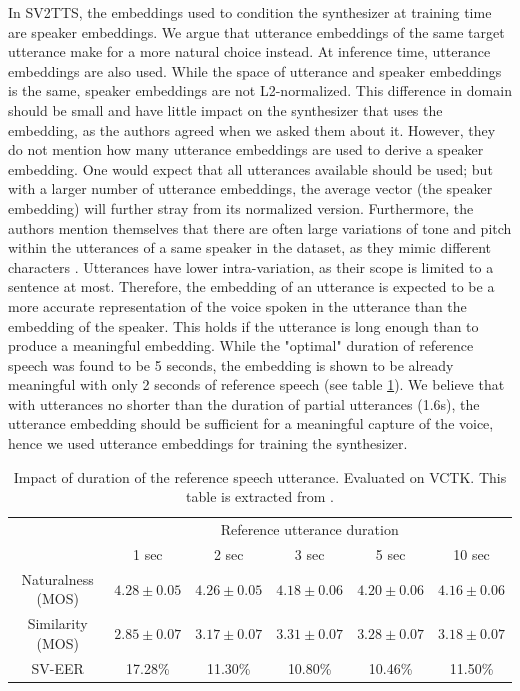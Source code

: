 \documentclass[a4paper, oneside, 12pt, english]{article}
\begin{document}
In SV2TTS, the embeddings used to condition the synthesizer at training time are speaker embeddings. We argue that utterance embeddings of the same target utterance make for a more natural choice instead. At inference time, utterance embeddings are also used. While the space of utterance and speaker embeddings is the same, speaker embeddings are not L2-normalized. This difference in domain should be small and have little impact on the synthesizer that uses the embedding, as the authors agreed when we asked them about it. However, they do not mention how many utterance embeddings are used to derive a speaker embedding. One would expect that all utterances available should be used; but with a larger number of utterance embeddings, the average vector (the speaker embedding) will further stray from its normalized version. Furthermore, the authors mention themselves that there are often large variations of tone and pitch within the utterances of a same speaker in the dataset, as they mimic different characters \citep[Appendix B]{SV2TTS}. Utterances have lower intra-variation, as their scope is limited to a sentence at most. Therefore, the embedding of an utterance is expected to be a more accurate representation of the voice spoken in the utterance than the embedding of the speaker. This holds if the utterance is long enough than to produce a meaningful embedding. While the "optimal" duration of reference speech was found to be 5 seconds, the embedding is shown to be already meaningful with only 2 seconds of reference speech (see table \ref{reference_speech_duration}). We believe that with utterances no shorter than the duration of partial utterances (1.6s), the utterance embedding should be sufficient for a meaningful capture of the voice, hence we used utterance embeddings for training the synthesizer.

\begin{table}[h]
	\begin{center}
		\begin{small}
			\begin{tabular}{cccccc}
				\toprule
				& \multicolumn{5}{c}{Reference utterance duration} \\
				& 1 sec & 2 sec & 3 sec & 5 sec & 10 sec \\
				\midrule
				Naturalness (MOS) & $4.28 \pm 0.05$ & 
				$4.26 \pm 0.05$ & $4.18 \pm 0.06$ & $4.20 \pm 0.06$ & $4.16 \pm 0.06$ \\
				Similarity (MOS) & $2.85 \pm 0.07$ & $3.17 \pm 0.07$ & $3.31 \pm 0.07$ & $3.28 \pm 0.07$ & $3.18 \pm 0.07$ \\
				SV-EER & 17.28\% & 11.30\% & 10.80\% & 10.46\% & 11.50\% \\
				\bottomrule
			\end{tabular}
		\end{small}
	\end{center}
	\caption{Impact of duration of the reference speech utterance. Evaluated on VCTK. This table is extracted from \citep{SV2TTS}.}
	\label{reference_speech_duration}
\end{table}
\end{document}
